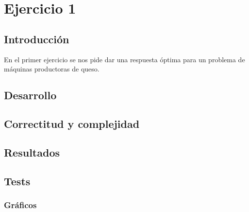 
	\section{Ejercicio 1}
    \subsection{Introducción}

En el primer ejercicio se nos pide dar una respuesta óptima para un problema de máquinas productoras de queso. 

    \subsection{Desarrollo}

    \pagebreak

    \subsection{Correctitud y complejidad}
	

    \pagebreak


    \subsection{Resultados}
	
	\subsection*{Tests}
	\subsubsection{Gráficos}
    \pagebreak
